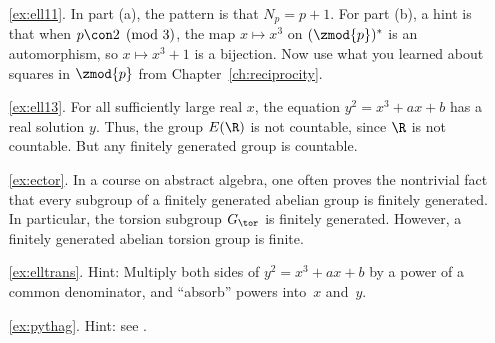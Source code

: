 \begin{itemize}
\begin{enumerate}
\item[\ref{ex:ell11}.]  In part (a), the pattern is that $N_p=p+1$.
For part (b), a hint is that when $p\con 2\pmod{3}$,
the map $x\mapsto x^3$ on $(\zmod{p})^*$ is an automorphism,
so $x\mapsto x^3+1$ is a bijection.  Now use what you learned
about squares in $\zmod{p}$ from Chapter~\ref{ch:reciprocity}.

\item[\ref{ex:ell13}.] For all sufficiently large real $x$, the
equation $y^2=x^3+ax+b$ has a real solution $y$.  Thus, the
group $E(\R)$ is not countable, since $\R$ is not countable.
But any finitely generated group is countable.

\item[\ref{ex:ector}.] In a course on abstract algebra, one often
  proves the nontrivial fact that every subgroup of a finitely
  generated abelian group is finitely generated.  In particular, the
  torsion subgroup $G_{\tor}$ is finitely generated.  However, a
  finitely generated abelian torsion group is finite.

\item[\ref{ex:elltrans}.]
Hint: Multiply both sides of $y^2=x^3+ax+b$ by a power of a common
denominator, and ``absorb'' powers into~$x$ and~$y$.

\item[\ref{ex:pythag}.] Hint: see .

\end{enumerate}


\end{itemize}
